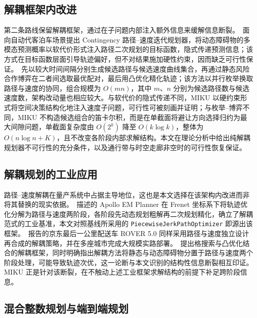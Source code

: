 \documentclass[a4paper,11pt]{ctexart}
\theoremstyle{definition}
\begin{document}
\subsection{解耦框架内改进}
\label{sec:related-decoupled}

第二条路线保留解耦框架，通过在子问题内部注入额外信息来缓解信息断裂。\citet{han2026_contingency}~面向自动代客泊车场景提出 Contingency 路径--速度迭代规划器，将动态障碍物的多模态预测概率以软代价形式注入路径二次规划的目标函数，隐式传递预测信息；该方式在目标函数层面引导轨迹偏好，但不对结果施加硬性约束，因而缺乏可行性保证。\citet{zhang2023_dp_rcg}~先以较大时间间隔分别生成候选路径与候选速度曲线集合，再通过静态风险合作博弈在二者间选取最优配对，最后用凸优化精化轨迹；该方法以并行枚举换取路径与速度的协同，组合规模为 $O(mn)$，其中 $m$、$n$ 分别为候选路径数与候选速度数，架构改动量也相应较大。与软代价的隐式传递不同，MIKU 以硬约束形式将空间决策结构化地注入速度子问题，可行性可被刻画并证明；与枚举--博弈不同，MIKU 不构造候选组合的笛卡尔积，而是在单截面将避让方向选择归约为最大间隙问题，单截面复杂度由 $O(2^k)$ 降至 $O(k\log k)$，整体为 $O(n\log n + K)$，且不改变各阶段内部求解结构。本文在理论分析中给出纯解耦规划器不可行性的充分条件，以及通行带与时空走廊非空时的可行性恢复保证。

\subsection{解耦规划的工业应用}
\label{sec:related-industrial}

路径--速度解耦在量产系统中占据主导地位，这也是本文选择在该架构内改进而非将其替换的现实依据。\citet{fan2018baidu}~描述的 Apollo EM Planner 在 Frenet 坐标系下将轨迹优化分解为路径与速度两阶段，各阶段先动态规划粗解再二次规划精化，确立了解耦范式的工业基准，本文对照基线所采用的 \texttt{PiecewiseJerkPathOptimizer} 即源出该框架。\citet{wang2022_jfr}~报告的京东最后一公里配送车 ROVER 5.0 同样采用路径与速度独立设计再合成的解耦策略，并在多座城市完成大规模实路部署。\citet{meng2019_access}~提出格搜索与凸优化结合的解耦框架，同时明确指出解耦方法将静态与动态障碍物分置于路径与速度两个阶段处理，可能导致轨迹次优，这一论断与本文识别的结构性信息断裂相互印证。MIKU 正是针对该断裂，在不触动上述工业框架求解结构的前提下补足跨阶段信息。

\subsection{混合整数规划与端到端规划}
\label{sec:related-supplement}
\end{document}
